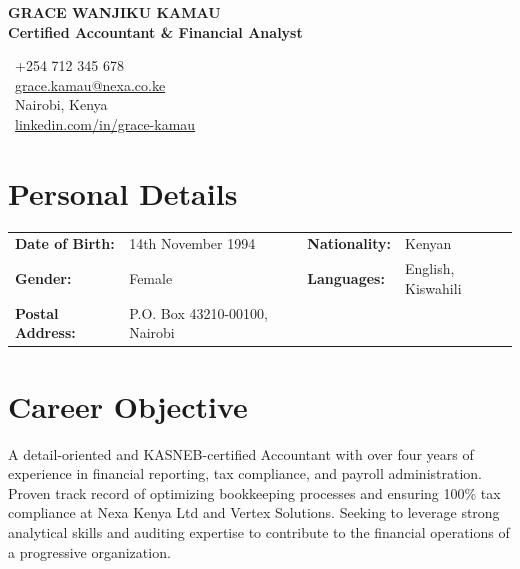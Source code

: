 \documentclass[10pt,a4paper]{article}
\begin{document}
\color{darkText}

\begin{tcolorbox}[colback=primaryColor, colframe=primaryColor, arc=0mm, top=6pt, bottom=6pt, left=10pt, right=10pt, boxrule=0pt]
  \begin{minipage}[t]{0.58\textwidth}
    {\color{white}\Large\bfseries GRACE WANJIKU KAMAU} \\[2pt]
    {\color{accentLight}\small\bfseries Certified Accountant \& Financial Analyst}
  \end{minipage}%
  \begin{minipage}[t]{0.42\textwidth}
    \raggedleft\scriptsize\color{white}
    \faPhone\ +254 712 345 678 \\
    \faEnvelope\ \href{mailto:grace.kamau@nexa.co.ke}{\color{white}grace.kamau@nexa.co.ke} \\
    \faMapMarker\ Nairobi, Kenya \\
    \faLinkedin\ \href{https://linkedin.com/in/grace-kamau-fictional}{\color{white}linkedin.com/in/grace-kamau}
  \end{minipage}
\end{tcolorbox}

\vspace{-2pt}

\section{Personal Details}
\begin{tabularx}{\textwidth}{@{}l X l X@{}}
  \textbf{Date of Birth:} & 14th November 1994 & \textbf{Nationality:} & Kenyan \\
  \textbf{Gender:} & Female & \textbf{Languages:} & English, Kiswahili \\
  \textbf{Postal Address:} & P.O. Box 43210-00100, Nairobi & & \\
\end{tabularx}

\section{Career Objective}
A detail-oriented and KASNEB-certified Accountant with over four years of experience in financial reporting, tax compliance, and payroll administration. Proven track record of optimizing bookkeeping processes and ensuring 100\% tax compliance at Nexa Kenya Ltd and Vertex Solutions. Seeking to leverage strong analytical skills and auditing expertise to contribute to the financial operations of a progressive organization.
\end{document}
